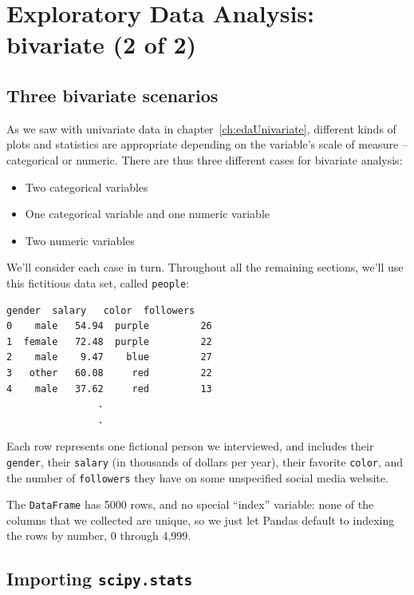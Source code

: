 
\chapter[EDA: bivariate (2 of 2)]{Exploratory Data Analysis: bivariate (2 of 2)}
\label{ch:edaBivariate2}

\section{Three bivariate scenarios}


As we saw with univariate data in chapter~\ref{ch:edaUnivariate}, different
kinds of plots and statistics are appropriate depending on the variable's scale
of measure -- categorical or numeric. There are thus three different cases for
bivariate analysis:

\begin{itemize}[nosep]
\item Two categorical variables
\item One categorical variable and one numeric variable
\item Two numeric variables
\end{itemize}

We'll consider each case in turn. Throughout all the remaining sections, we'll
use this fictitious data set, called \texttt{people}:

\begin{Verbatim}[fontsize=\small,samepage=true,frame=leftline,framesep=5mm,framerule=1mm]
   gender  salary   color  followers
0    male   54.94  purple         26
1  female   72.48  purple         22
2    male    9.47    blue         27
3   other   60.08     red         22
4    male   37.62     red         13
                .
                .
\end{Verbatim}

Each row represents one fictional person we interviewed, and includes their 
\texttt{gender}, their \texttt{salary} (in thousands of dollars per year),
their favorite \texttt{color}, and the number of \texttt{followers} they have
on some unspecified social media website.

The \texttt{DataFrame} has 5000 rows, and no special ``index'' variable: none
of the columns that we collected are unique, so we just let Pandas default to
indexing the rows by number, 0 through 4,999.

\section{Importing \texttt{scipy.stats}}

